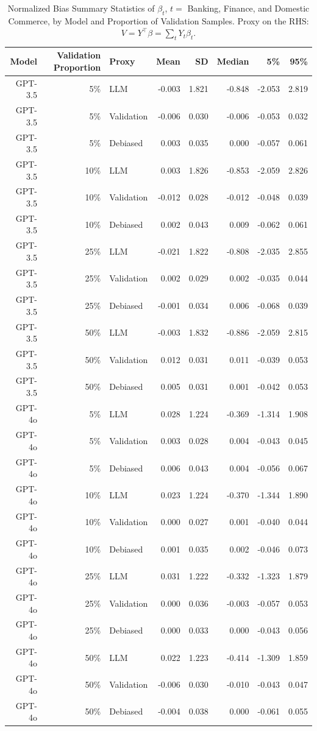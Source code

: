 \begin{table}

\caption{Normalized Bias Summary Statistics of $\beta_{t}$, $t=$ Banking, Finance, and Domestic Commerce, by Model and Proportion of Validation Samples. Proxy on the RHS: $V = Y^\top \beta = \sum_{t} Y_t \beta_t$.}
\centering
\begin{tabular}[t]{rrlrrrrr}
\toprule
Model & Validation Proportion & Proxy & Mean & SD & Median & 5\% & 95\%\\
\midrule
GPT-3.5 & 5\% & LLM & -0.003 & 1.821 & -0.848 & -2.053 & 2.819\\
GPT-3.5 & 5\% & Validation & -0.006 & 0.030 & -0.006 & -0.053 & 0.032\\
GPT-3.5 & 5\% & Debiased & 0.003 & 0.035 & 0.000 & -0.057 & 0.061\\
GPT-3.5 & 10\% & LLM & 0.003 & 1.826 & -0.853 & -2.059 & 2.826\\
GPT-3.5 & 10\% & Validation & -0.012 & 0.028 & -0.012 & -0.048 & 0.039\\
GPT-3.5 & 10\% & Debiased & 0.002 & 0.043 & 0.009 & -0.062 & 0.061\\
GPT-3.5 & 25\% & LLM & -0.021 & 1.822 & -0.808 & -2.035 & 2.855\\
GPT-3.5 & 25\% & Validation & 0.002 & 0.029 & 0.002 & -0.035 & 0.044\\
GPT-3.5 & 25\% & Debiased & -0.001 & 0.034 & 0.006 & -0.068 & 0.039\\
GPT-3.5 & 50\% & LLM & -0.003 & 1.832 & -0.886 & -2.059 & 2.815\\
GPT-3.5 & 50\% & Validation & 0.012 & 0.031 & 0.011 & -0.039 & 0.053\\
GPT-3.5 & 50\% & Debiased & 0.005 & 0.031 & 0.001 & -0.042 & 0.053\\
GPT-4o & 5\% & LLM & 0.028 & 1.224 & -0.369 & -1.314 & 1.908\\
GPT-4o & 5\% & Validation & 0.003 & 0.028 & 0.004 & -0.043 & 0.045\\
GPT-4o & 5\% & Debiased & 0.006 & 0.043 & 0.004 & -0.056 & 0.067\\
GPT-4o & 10\% & LLM & 0.023 & 1.224 & -0.370 & -1.344 & 1.890\\
GPT-4o & 10\% & Validation & 0.000 & 0.027 & 0.001 & -0.040 & 0.044\\
GPT-4o & 10\% & Debiased & 0.001 & 0.035 & 0.002 & -0.046 & 0.073\\
GPT-4o & 25\% & LLM & 0.031 & 1.222 & -0.332 & -1.323 & 1.879\\
GPT-4o & 25\% & Validation & 0.000 & 0.036 & -0.003 & -0.057 & 0.053\\
GPT-4o & 25\% & Debiased & 0.000 & 0.033 & 0.000 & -0.043 & 0.056\\
GPT-4o & 50\% & LLM & 0.022 & 1.223 & -0.414 & -1.309 & 1.859\\
GPT-4o & 50\% & Validation & -0.006 & 0.030 & -0.010 & -0.043 & 0.047\\
GPT-4o & 50\% & Debiased & -0.004 & 0.038 & 0.000 & -0.061 & 0.055\\
\bottomrule
\end{tabular}
\end{table}

